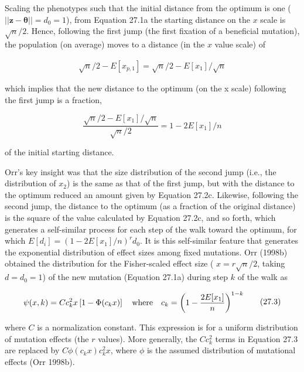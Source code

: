 \documentclass{article}
\begin{document}
Scaling the phenotypes such that the initial distance from the optimum is one ( $ ||\mathbf{z}-\boldsymbol{\theta}|| = d_0 = 1 $), from Equation 27.1a the starting distance on the  $ x $ scale is  $ \sqrt{n}/2 $. Hence, following the first jump (the first fixation of a beneficial mutation), the population (on average) moves to a distance (in the  $ x $ value scale) of

\begin{equation}
\begin{align*}\sqrt{n}/2-E[x_{p,1}]=\sqrt{n}/2-E[x_1]/\sqrt{n}\end{align*}
\end{equation}

which implies that the new distance to the optimum (on the x scale) following the first jump is a fraction,

\begin{equation}
\frac{\sqrt{n}/2-E[x_{1}]/\sqrt{n}}{\sqrt{n}/2}=1-2E[x_{1}]/n
\tag{27.2c}
\label{eq:27_2c}
\end{equation}

of the initial starting distance.

Orr's key insight was that the size distribution of the second jump (i.e., the distribution of  $ x_2 $) is the same as that of the first jump, but with the distance to the optimum reduced an amount given by Equation 27.2c. Likewise, following the second jump, the distance to the optimum (as a fraction of the original distance) is the square of the value calculated by Equation 27.2c, and so forth, which generates a self-similar process for each step of the walk toward the optimum, for which  $ E[d_i] = (1 - 2E[x_1]/n)^r d_0 $. It is this self-similar feature that generates the exponential distribution of effect sizes among fixed mutations. Orr (1998b) obtained the distribution for the Fisher-scaled effect size ( $ x = r \sqrt{n}/2 $, taking  $ d = d_0 = 1 $) of the new mutation (Equation 27.1a) during step  $ k $ of the walk as

\begin{equation}
\begin{align*}\psi(x,k)=C c_k^2 x\left[1-\Phi(c_kx)\right]\quad{\rm where}\quad c_k=\left(1-\frac{2E[x_1]}{n}\right)^{1-k}\end{align*}
\tag{27.3}
\label{eq:27_3}
\end{equation}

where $C$ is a normalization constant. This expression is for a uniform distribution of mutation effects (the $r$ values). More generally, the $C c_k^2$ terms in Equation 27.3 are replaced by $C \phi(c_k x) c_k^2 x$, where $\phi$ is the assumed distribution of mutational effects (Orr 1998b).
\end{document}
